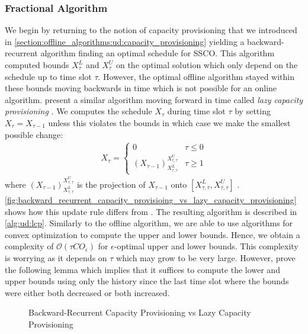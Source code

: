 \subsubsection{Fractional Algorithm}

We begin by returning to the notion of capacity provisioning that we introduced in \autoref{section:offline_algorithms:ud:capacity_provisioning} yielding a backward-recurrent algorithm finding an optimal schedule for SSCO. This algorithm computed bounds $X_{\tau}^L$ and $X_{\tau}^U$ on the optimal solution which only depend on the schedule up to time slot $\tau$. However, the optimal offline algorithm stayed within these bounds moving backwards in time which is not possible for an online algorithm. \citeauthor*{Lin2011} present a similar algorithm moving forward in time called \emph{lazy capacity provisioning} \cite{Lin2011}. We computes the schedule $X_{\tau}$ during time slot $\tau$ by setting $X_{\tau} = X_{\tau-1}$ unless this violates the bounds in which case we make the smallest possible change: \begin{align*}
    X_{\tau} = \begin{cases}
        0 & \tau \leq 0 \\
        (X_{\tau-1})_{X_{\tau,\tau}^L}^{X_{\tau,\tau}^U} & \tau \geq 1
    \end{cases}
\end{align*} where $(X_{\tau-1})_{X_{\tau,\tau}^L}^{X_{\tau,\tau}^U}$ is the projection of $X_{\tau-1}$ onto $[X_{\tau,\tau}^L, X_{\tau,\tau}^U]$ \cite{Lin2011}. \autoref{fig:backward_recurrent_capacity_provisioing_vs_lazy_capacity_provisioning} shows how this update rule differs from . The resulting algorithm is described in \autoref{alg:ud:lcp}. Similarly to the offline algorithm, we are able to use algorithms for convex optimization to compute the upper and lower bounds. Hence, we obtain a complexity of $\mathcal{O}(\tau C O_{\epsilon})$ for $\epsilon$-optimal upper and lower bounds. This complexity is worrying as it depends on $\tau$ which may grow to be very large. However, \citeauthor*{Lin2011} prove the following lemma which implies that it suffices to compute the lower and upper bounds using only the history since the last time slot where the bounds were either both decreased or both increased.

\begin{figure}
    \centering
    [TODO]

    \caption{Backward-Recurrent Capacity Provisioning vs Lazy Capacity Provisioning}
    \label{fig:backward_recurrent_capacity_provisioing_vs_lazy_capacity_provisioning}
\end{figure}

